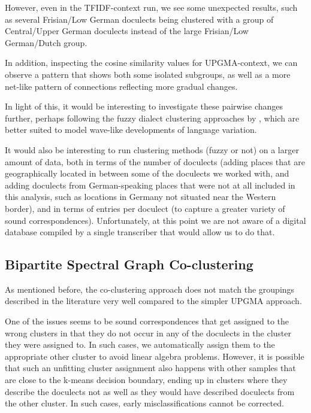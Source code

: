 \documentclass[a4paper]{article}
\begin{document}
However, even in the TFIDF-context run,
we see some unexpected results,
such as several Frisian/Low German doculects
being clustered with a group of Central/Upper German doculects
instead of the large Frisian/Low German/Dutch group.

In addition, inspecting the cosine similarity values
for UPGMA-context, we can observe a pattern
that shows both some isolated subgroups, as well as
a more net-like pattern of connections
reflecting more gradual changes.

In light of this, it would be interesting
to investigate these pairwise changes further,
perhaps following the fuzzy dialect clustering approaches
by \citet{proell2013detecting}, which are better suited to model
wave-like developments of language variation.

It would also be interesting to run clustering
methods (fuzzy or not) on a larger amount of data,
both in terms of the number of doculects
(adding places that are geographically located
in between some of the doculects we worked with,
and adding doculects from German-speaking places that
were not at all included in this analysis, such as
locations in Germany not situated near the Western border),
and in terms of entries per doculect
(to capture a greater variety of sound correspondences).
Unfortunately, at this point we are not aware of
a digital database compiled by a single transcriber that
would allow us to do that.


\subsection{Bipartite Spectral Graph Co-clustering}

As mentioned before, the co-clustering approach
does not match the groupings described in the literature very well
compared to the simpler UPGMA approach.

One of the issues seems to be
sound correspondences that get assigned to the wrong clusters
in that they do not occur in any of the doculects in the cluster
they were assigned to.
In such cases, we automatically assign them to the appropriate
other cluster to avoid linear algebra problems.
However, it is possible that such an unfitting
cluster assignment also happens with other samples
that are close to the k-means decision boundary,
ending up in clusters where they describe the doculects
not as well as they would have described doculects from the other cluster.
In such cases, early misclassifications cannot be corrected.
\end{document}
